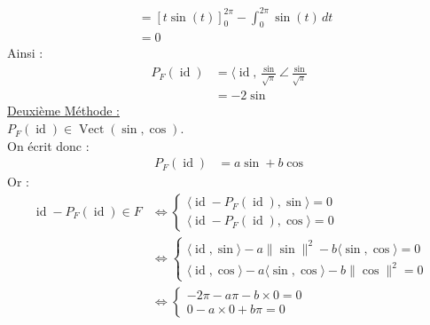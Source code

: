 \documentclass[../main.tex]{subfiles}
\begin{document}
\begin{itemize}
\begin{align*}
        &= \left[ t\sin(t) \right]_0^{2\pi} - \int_0^{2\pi} \sin(t) \,dt \\
        &= 0
    \end{align*}
    Ainsi : 
    \begin{align*}
        P_F(\operatorname{id}) &= \langle \operatorname{id}, \frac{\sin}{\sqrt{\pi}}\angle \frac{\sin}{\sqrt{\pi}} \\
        &= -2\sin
    \end{align*}
    \underline{Deuxième Méthode :} \\
    $P_F(\operatorname{id})\in \operatorname{Vect}(\sin, \cos)$. \\
    On écrit donc : 
    \begin{align*}
        P_F(\operatorname{id}) &= a\sin + b\cos
    \end{align*}
    Or : 
    \begin{align*}
        \operatorname{id} - P_F(\operatorname{id}) \in F &\Leftrightarrow \begin{cases}
            \langle \operatorname{id} - P_F(\operatorname{id}), \sin\rangle = 0 \\
            \langle \operatorname{id} - P_F(\operatorname{id}), \cos\rangle = 0
        \end{cases} \\
        &\Leftrightarrow \begin{cases}
            \langle \operatorname{id}, \sin\rangle - a\|\sin\|^2 - b\langle \sin, \cos\rangle = 0 \\
            \langle \operatorname{id}, \cos\rangle - a\langle \sin, \cos\rangle - b\|\cos\|^2 = 0
        \end{cases} \\
        &\Leftrightarrow \begin{cases}
            -2\pi - a\pi - b\times 0 = 0 \\
            0 - a\times 0 + b\pi = 0
        \end{cases}
    \end{align*}
\end{itemize}
\end{document}
